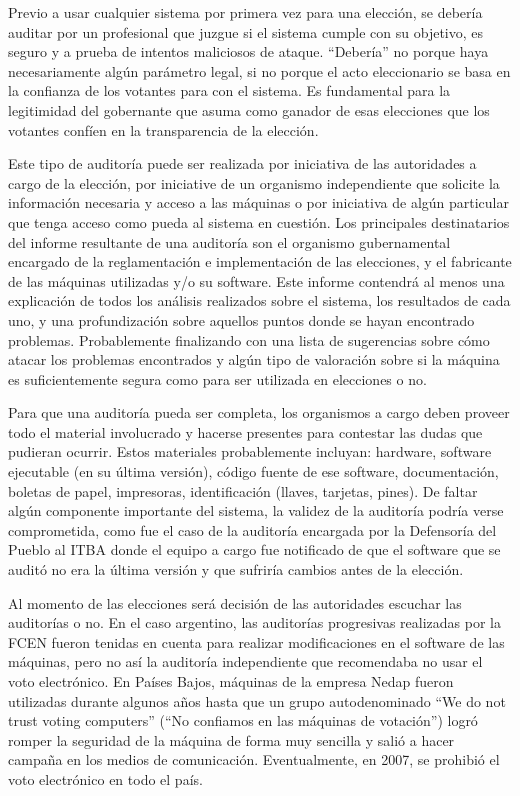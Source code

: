 Previo a usar cualquier sistema por primera vez para una elección, se debería auditar por un profesional que juzgue si el sistema cumple con su objetivo, es seguro y a prueba de intentos maliciosos de ataque. “Debería” no porque haya necesariamente algún parámetro legal, si no porque el acto eleccionario se basa en la confianza de los votantes para con el sistema. Es fundamental para la legitimidad del gobernante que asuma como ganador de esas elecciones que los votantes confíen en la transparencia de la elección.

Este tipo de auditoría puede ser realizada por iniciativa de las autoridades a cargo de la elección\cite{righetti}, por iniciative de un organismo independiente que solicite la información necesaria y acceso a las máquinas\cite{holanda}\cite{itba} o por iniciativa de algún particular que tenga acceso como pueda al sistema en cuestión\cite{votar}.
Los principales destinatarios del informe resultante de una auditoría son el organismo gubernamental encargado de la reglamentación e implementación de las elecciones, y el fabricante de las máquinas utilizadas y/o su software. Este informe contendrá al menos una explicación de todos los análisis realizados sobre el sistema, los resultados de cada uno, y una profundización sobre aquellos puntos donde se hayan encontrado problemas. Probablemente finalizando con una lista de sugerencias sobre cómo atacar los problemas encontrados y algún tipo de valoración sobre si la máquina es suficientemente segura como para ser utilizada en elecciones o no.

Para que una auditoría pueda ser completa, los organismos a cargo deben proveer todo el material involucrado y hacerse presentes para contestar las dudas que pudieran ocurrir. Estos materiales probablemente incluyan: hardware, software ejecutable (en su última versión), código fuente de ese software, documentación, boletas de papel, impresoras, identificación (llaves, tarjetas, pines). De faltar algún componente importante del sistema, la validez de la auditoría podría verse comprometida, como fue el caso de la auditoría encargada por la Defensoría del Pueblo al ITBA donde el equipo a cargo fue notificado de que el software que se auditó no era la última versión y que sufriría cambios antes de la elección\cite{itba}.

Al momento de las elecciones será decisión de las autoridades escuchar las auditorías o no. En el caso argentino, las auditorías progresivas realizadas por la FCEN fueron tenidas en cuenta para realizar modificaciones en el software de las máquinas, pero no así la auditoría independiente que recomendaba no usar el voto electrónico. En Países Bajos, máquinas de la empresa Nedap fueron utilizadas durante algunos años hasta que un grupo autodenominado “We do not trust voting computers” (“No confiamos en las máquinas de votación”) logró romper la seguridad de la máquina de forma muy sencilla y salió a hacer campaña en los medios de comunicación. Eventualmente, en 2007, se prohibió el voto electrónico en todo el país\cite{holanda}.

